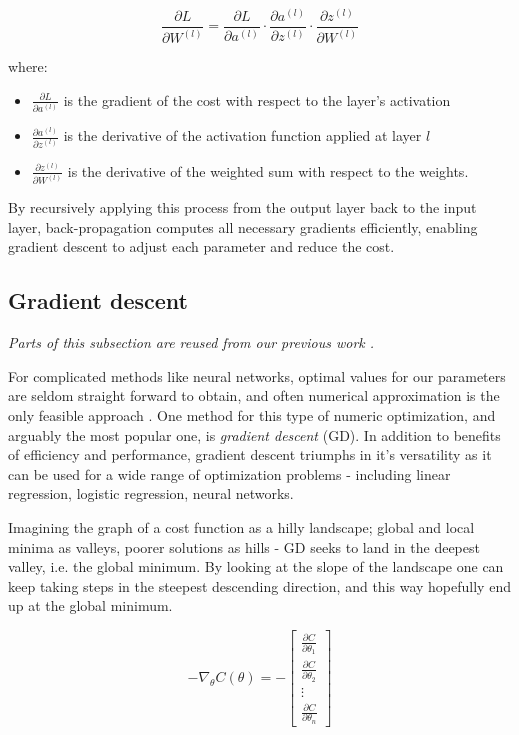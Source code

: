\begin{equation}
\frac{\partial L}{\partial W^{(l)}} = \frac{\partial L}{\partial a^{(l)}} \cdot \frac{\partial a^{(l)}}{\partial z^{(l)}} \cdot \frac{\partial z^{(l)}}{\partial W^{(l)}}
\end{equation}

where:
\begin{itemize}[label=--]
    \item $\frac{\partial L}{\partial a^{(l)}}$ is the gradient of the cost with respect to the layer’s activation
    \item $\frac{\partial a^{(l)}}{\partial z^{(l)}}$ is the derivative of the activation function applied at layer $l$
    \item $\frac{\partial z^{(l)}}{\partial W^{(l)}}$ is the derivative of the weighted sum with respect to the weights.
\end{itemize}

By recursively applying this process from the output layer back to the input layer, back-propagation computes all necessary gradients efficiently, enabling gradient descent to adjust each parameter and reduce the cost.

\subsection{Gradient descent}\label{sec:gd}
\textit{Parts of this subsection are reused from our previous work \citep[p. 4-6]{project2}.}

For complicated methods like neural networks, optimal values for our parameters are seldom straight forward to obtain, and often numerical approximation is the only feasible approach \citep[Week 40]{morten}.  
One method for this type of numeric optimization, and arguably the most popular one, is \textit{gradient descent} (GD). In addition to benefits of efficiency and performance, gradient descent triumphs in it's versatility as it can be used for a wide range of optimization problems - including linear regression, logistic regression, neural networks. 

Imagining the graph of a cost function as a hilly landscape; global and local minima as valleys, poorer solutions as hills - GD seeks to land in the deepest valley, i.e. the global minimum. 
By looking at the slope of the landscape one can keep taking steps in the steepest descending direction, and this way hopefully end up at the global minimum.

\begin{equation}\label{eq:gd}
    -\nabla_\theta C(\theta) = -\begin{bmatrix}
\frac{\partial C}{\partial \theta_1} \\
\frac{\partial C}{\partial \theta_2} \\
\vdots \\
\frac{\partial C}{\partial \theta_n}
\end{bmatrix}
\end{equation}


